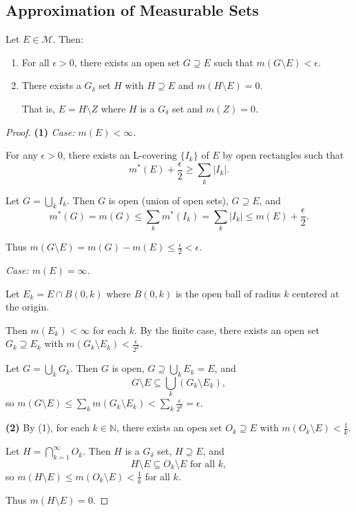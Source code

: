 \documentclass[11pt]{report}
\begin{document}
\subsection{Approximation of Measurable Sets}

\begin{thmbox}
Let $E \in \mathcal{M}$. Then:
\begin{enumerate}
    \item For all $\epsilon > 0$, there exists an open set $G \supseteq E$ such that $m(G \setminus E) < \epsilon$.
    \item There exists a $G_\delta$ set $H$ with $H \supseteq E$ and $m(H \setminus E) = 0$.
    
    That is, $E = H \setminus Z$ where $H$ is a $G_\delta$ set and $m(Z) = 0$.
\end{enumerate}
\end{thmbox}

\begin{proof}
\textbf{(1)} \textit{Case: $m(E) < \infty$.}

For any $\epsilon > 0$, there exists an L-covering $\{I_k\}$ of $E$ by open rectangles such that
\[
m^*(E) + \frac{\epsilon}{2} \geq \sum_k |I_k|.
\]

Let $G = \bigcup_k I_k$. Then $G$ is open (union of open sets), $G \supseteq E$, and
\[
m^*(G) = m(G) \leq \sum_k m^*(I_k) = \sum_k |I_k| \leq m(E) + \frac{\epsilon}{2}.
\]

Thus $m(G \setminus E) = m(G) - m(E) \leq \frac{\epsilon}{2} < \epsilon$.

\textit{Case: $m(E) = \infty$.}

Let $E_k = E \cap B(0, k)$ where $B(0, k)$ is the open ball of radius $k$ centered at the origin.

Then $m(E_k) < \infty$ for each $k$. By the finite case, there exists an open set $G_k \supseteq E_k$ with $m(G_k \setminus E_k) < \frac{\epsilon}{2^k}$.

Let $G = \bigcup_k G_k$. Then $G$ is open, $G \supseteq \bigcup_k E_k = E$, and
\[
G \setminus E \subseteq \bigcup_k (G_k \setminus E_k),
\]
so $m(G \setminus E) \leq \sum_k m(G_k \setminus E_k) < \sum_k \frac{\epsilon}{2^k} = \epsilon$.

\textbf{(2)} By (1), for each $k \in \mathbb{N}$, there exists an open set $O_k \supseteq E$ with $m(O_k \setminus E) < \frac{1}{k}$.

Let $H = \bigcap_{k=1}^{\infty} O_k$. Then $H$ is a $G_\delta$ set, $H \supseteq E$, and
\[
H \setminus E \subseteq O_k \setminus E \text{ for all } k,
\]
so $m(H \setminus E) \leq m(O_k \setminus E) < \frac{1}{k}$ for all $k$.

Thus $m(H \setminus E) = 0$.
\end{proof}
\end{document}
